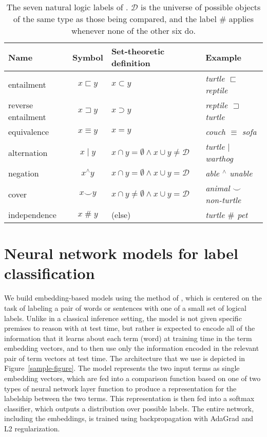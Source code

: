 \documentclass[letterpaper]{article}
\newcommand{\nateq}{\equiv}
\newcommand{\natind}{\mathbin{\#}}
\newcommand{\natneg}{\mathbin{^{\wedge}}}
\newcommand{\natfor}{\sqsubset}
\newcommand{\natrev}{\sqsupset}
\newcommand{\natalt}{\mathbin{|}}
\newcommand{\natcov}{\mathbin{\smallsmile}}
\def\ii#1{\textit{#1}}
\begin{document}
\begin{table*}[tp]
  \centering%
  \setlength{\tabcolsep}{15pt}
  \renewcommand{\arraystretch}{1.2}
  \begin{tabular}{l c l l} 
    \toprule
    Name & Symbol & Set-theoretic definition & Example \\ 
    \midrule
    entailment         & $x \natfor y$   & $x \subset y$ & \ii{turtle $\natfor$ reptile}  \\ 
    reverse entailment & $x \natrev y$   & $x \supset y$ & \ii{reptile $\natrev$ turtle}  \\ 
    equivalence        & $x \nateq y$    & $x = y$       & \ii{couch $\nateq$ sofa} \\ 
    alternation        & $x \natalt y$   & $x \cap y = \emptyset \wedge x \cup y \neq \mathcal{D}$ & \ii{turtle $\natalt$ warthog} \\ 
    negation           & $x \natneg y$   & $x \cap y = \emptyset \wedge x \cup y = \mathcal{D}$    & \ii{able $\natneg$ unable} \\
    cover              & $x \natcov y$   & $x \cap y \neq \emptyset \wedge x \cup y = \mathcal{D}$ & \ii{animal $\natcov$ non-turtle} \\ 
    independence       & $x \natind y$   & (else) & \ii{turtle $\natind$ pet}\\
    \bottomrule
  \end{tabular}
  \protect\caption{\protect\label{b-table}The seven natural logic labels of \protect\cite{maccartney2009extended}. 
    $\mathcal{D}$ is the universe of possible objects of the same type as those being compared, 
    and the label $\natind$ applies whenever none of the other six do.} 
\end{table*}

\section{Neural network models for label classification} \label{methods}

We build embedding-based models using the method of
\cite{Bowman:Potts:Manning:2014}, which is centered on the task of
labeling a pair of words or sentences with one of a small set of
logical labels. Unlike in a classical inference
setting, the model is not given specific premises to reason with at test time, but rather
is expected to encode all of the information that it learns about each term (word) at training
time in the term embedding vectors, and to then use only the information encoded in the relevant pair of
term vectors at test time. 
The architecture that we use is depicted in
Figure~\ref{sample-figure}. The model represents the two input terms
as single embedding vectors, which are fed into a comparison function based on one
of two types of neural network layer function to produce a
representation for the labelship between the two terms. This
representation is then fed into a softmax classifier, which outputs a
distribution over possible labels. The entire network, including the
embeddings, is trained using backpropagation with AdaGrad \cite{duchi2011adaptive}
and L2 regularization.
\end{document}
